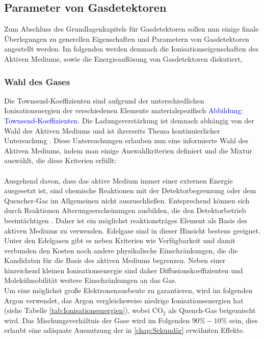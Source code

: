 			 \newpage
		\subsection{Parameter von Gasdetektoren} \label{sec: Parameter}
			Zum Abschluss des Grundlagenkapitels für Gasdetektoren sollen nun einige finale Überlegungen zu generellen Eigenschaften und Parametern von Gasdetektoren angestellt werden. Im folgenden werden demnach die Ionisationseigenschaften des Aktiven Mediums, sowie die Energieauflösung von Gasdetektoren diskutiert,
			
			\subsubsection{Wahl des Gases}
				Die Townsend-Koeffizienten sind aufgrund der unterschiedlichen Ionisationsnergien der verschiedenen Elemente materialspezifisch \textcolor{blue}{Abbildung: Townsend-Koeffizienten}. Die Ladungsverstärkung ist demnach abhängig von der Wahl des Aktiven Mediums und ist ihrerseits Thema kontinuierlicher Untersuchung \cite{GAS_MIX}. 
				Diese Untersuchungen erlauben nun eine informierte Wahl des Aktiven Mediums, indem man einige Auswahlkriterien definiert und die Mixtur auswählt, die diese Kriterien erfüllt:\\
				\\
				Ausgehend davon, dass das aktive Medium immer einer externen Energie ausgesetzt ist, sind chemische Reaktionen mit der Detektorbegrenzung oder dem Quencher-Gas im Allgemeinen nicht auszuschließen. Entsprechend können sich durch Reaktionen Alterungserscheinungen ausbilden, die den Detektorbetrieb beeintächtigen \cite{Ageing}. Daher ist ein möglichst reaktionsträges Element als Basis des aktiven Mediums zu verwenden. Edelgase sind in dieser Hinsicht bestens geeignet.\\
				Unter den Edelgasen gibt es neben Kriterien wie Verfügbarkeit und damit verbunden den Kosten noch andere physikalische Einschränkungen, die die Kandidaten für die Basis des aktiven Mediums begrenzen. Neben einer hinreichend kleinen Ionisationsenergie sind daher Diffusionskoeffizienten und Molekülmobilität weitere Einschränkungen an das Gas. \\
				Um eine möglichst große Elektronenausbeute zu garantieren, wird im folgenden Argon verwendet, das Argon vergleichsweise niedrige Ionisationsenergien hat (siehe Tabelle \ref{tab:Ionisationsenergien}), wobei CO$_{2}$ als Quench-Gas beigemischt wird. Das Mischungsverhältnis der Gase wird im Folgenden $90\%-10\%$ sein, dies erlaubt eine adäquate Ausnutzung der in \ref{chap:Sekundär} erwähnten Effekte.
				
